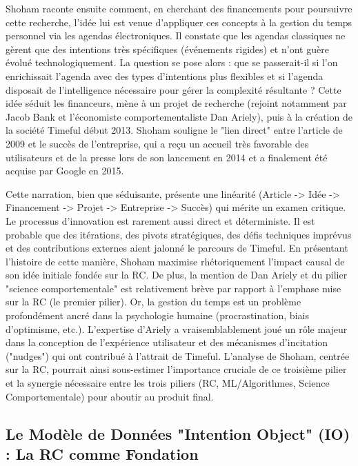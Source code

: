 \documentclass[11pt,a4paper]{article}
\begin{document}
Shoham raconte ensuite comment, en cherchant des financements pour poursuivre cette recherche, l'idée lui est venue d'appliquer ces concepts à la gestion du temps personnel via les agendas électroniques. Il constate que les agendas classiques ne gèrent que des intentions très spécifiques (événements rigides) et n'ont guère évolué technologiquement. La question se pose alors : que se passerait-il si l'on enrichissait l'agenda avec des types d'intentions plus flexibles et si l'agenda disposait de l'intelligence nécessaire pour gérer la complexité résultante \citep{Shoham2015Why}? Cette idée séduit les financeurs, mène à un projet de recherche (rejoint notamment par Jacob Bank et l'économiste comportementaliste Dan Ariely), puis à la création de la société Timeful début 2013. Shoham souligne le "lien direct" \citep{Shoham2015Why} entre l'article de 2009 et le succès de l'entreprise, qui a reçu un accueil très favorable des utilisateurs et de la presse lors de son lancement en 2014 et a finalement été acquise par Google en 2015.

Cette narration, bien que séduisante, présente une linéarité (Article -> Idée -> Financement -> Projet -> Entreprise -> Succès) qui mérite un examen critique. Le processus d'innovation est rarement aussi direct et déterministe. Il est probable que des itérations, des pivots stratégiques, des défis techniques imprévus et des contributions externes aient jalonné le parcours de Timeful. En présentant l'histoire de cette manière, Shoham maximise rhétoriquement l'impact causal de son idée initiale fondée sur la RC. De plus, la mention de Dan Ariely et du pilier "science comportementale" \citep{Shoham2015Why} est relativement brève par rapport à l'emphase mise sur la RC (le premier pilier). Or, la gestion du temps est un problème profondément ancré dans la psychologie humaine (procrastination, biais d'optimisme, etc.). L'expertise d'Ariely a vraisemblablement joué un rôle majeur dans la conception de l'expérience utilisateur et des mécanismes d'incitation ("nudges") qui ont contribué à l'attrait de Timeful. L'analyse de Shoham, centrée sur la RC, pourrait ainsi sous-estimer l'importance cruciale de ce troisième pilier et la synergie nécessaire entre les trois piliers (RC, ML/Algorithmes, Science Comportementale) pour aboutir au produit final.

\subsection{Le Modèle de Données "Intention Object" (IO) : La RC comme Fondation}
\end{document}
